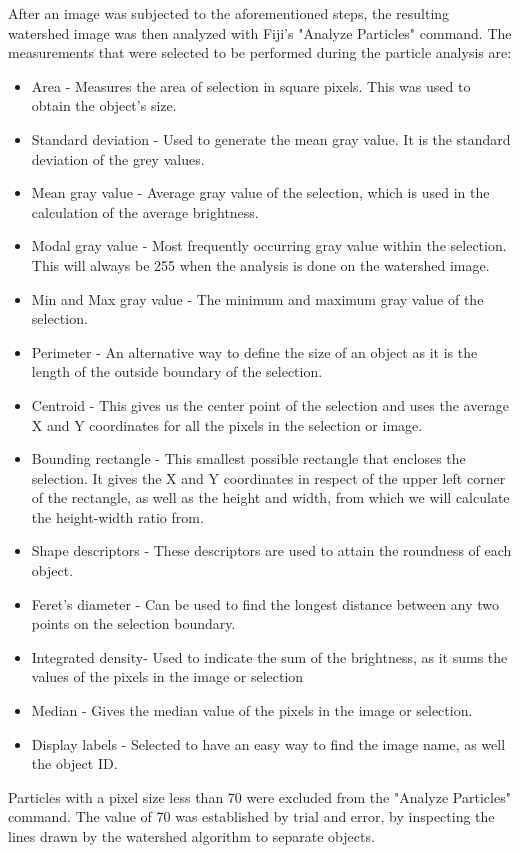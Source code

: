 \documentclass[paper=A4,bibliography=totocnumbered]{scrartcl}
\begin{document}
After an image was subjected to the aforementioned steps, the resulting watershed image was then analyzed with Fiji's  "Analyze Particles" command. The measurements that were selected to be performed during the particle analysis are:
\begin{itemize}
\item Area - Measures the area of selection in square pixels. This was used to obtain the object's size.
\item Standard deviation - Used to generate the mean gray value. It is the standard deviation of the grey values.
\item Mean gray value - Average gray value of the selection, which is used in the calculation of the average brightness.
\item Modal gray value - Most frequently occurring gray value within the selection. This will always be 255 when the analysis is done on the watershed image.
\item Min and Max gray value - The minimum and maximum gray value of the selection.
\item Perimeter - An alternative way to define the size of an object as it is the length of the outside boundary of the selection.
\item Centroid - This gives us the center point of the selection and uses the average X and Y coordinates for all the pixels in the selection or image.
\item Bounding rectangle - This smallest possible rectangle that encloses the selection. It gives the X and Y coordinates in respect of the upper left corner of the rectangle, as well as the height and width, from which we will calculate the height-width ratio from.
\item Shape descriptors - These descriptors are used to attain the roundness of each object.
\item Feret's diameter - Can be used to find the longest distance between any two points on the selection boundary.
\item Integrated density- Used to indicate the sum of the brightness, as it sums the values of the pixels in the image or selection
\item Median - Gives the median value of the pixels in the image or selection.
\item Display labels - Selected to have an easy way to find the image name, as well the object ID.
\end{itemize}

Particles with a pixel size less than 70 were excluded from the "Analyze Particles" command. The value of 70 was established by trial and error, by inspecting the lines drawn by the watershed algorithm to separate objects.
\end{document}
